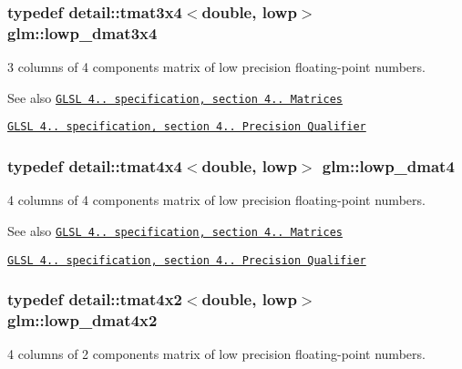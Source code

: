 \subsubsection[{\texorpdfstring{lowp\+\_\+dmat3x4}{lowp_dmat3x4}}]{\setlength{\rightskip}{0pt plus 5cm}typedef detail\+::tmat3x4$<$double, lowp$>$ {\bf glm\+::lowp\+\_\+dmat3x4}}\hypertarget{group__core__precision_ga4640e1d20ad705842525e79a4cc57b15}{}\label{group__core__precision_ga4640e1d20ad705842525e79a4cc57b15}
3 columns of 4 components matrix of low precision floating-\/point numbers.

\begin{DoxySeeAlso}{See also}
\href{http://www.opengl.org/registry/doc/GLSLangSpec.4.20.8.pdf}{\tt G\+L\+SL 4.. specification, section 4.. Matrices} 

\href{http://www.opengl.org/registry/doc/GLSLangSpec.4.20.8.pdf}{\tt G\+L\+SL 4.. specification, section 4.. Precision Qualifier} 
\end{DoxySeeAlso}
\subsubsection[{\texorpdfstring{lowp\+\_\+dmat4}{lowp_dmat4}}]{\setlength{\rightskip}{0pt plus 5cm}typedef detail\+::tmat4x4$<$double, lowp$>$ {\bf glm\+::lowp\+\_\+dmat4}}\hypertarget{group__core__precision_gaea69794db4e619881b77d37bf84b337e}{}\label{group__core__precision_gaea69794db4e619881b77d37bf84b337e}
4 columns of 4 components matrix of low precision floating-\/point numbers.

\begin{DoxySeeAlso}{See also}
\href{http://www.opengl.org/registry/doc/GLSLangSpec.4.20.8.pdf}{\tt G\+L\+SL 4.. specification, section 4.. Matrices} 

\href{http://www.opengl.org/registry/doc/GLSLangSpec.4.20.8.pdf}{\tt G\+L\+SL 4.. specification, section 4.. Precision Qualifier} 
\end{DoxySeeAlso}
\subsubsection[{\texorpdfstring{lowp\+\_\+dmat4x2}{lowp_dmat4x2}}]{\setlength{\rightskip}{0pt plus 5cm}typedef detail\+::tmat4x2$<$double, lowp$>$ {\bf glm\+::lowp\+\_\+dmat4x2}}\hypertarget{group__core__precision_ga28a7ef670069c3707f19b9de1039517e}{}\label{group__core__precision_ga28a7ef670069c3707f19b9de1039517e}
4 columns of 2 components matrix of low precision floating-\/point numbers.

